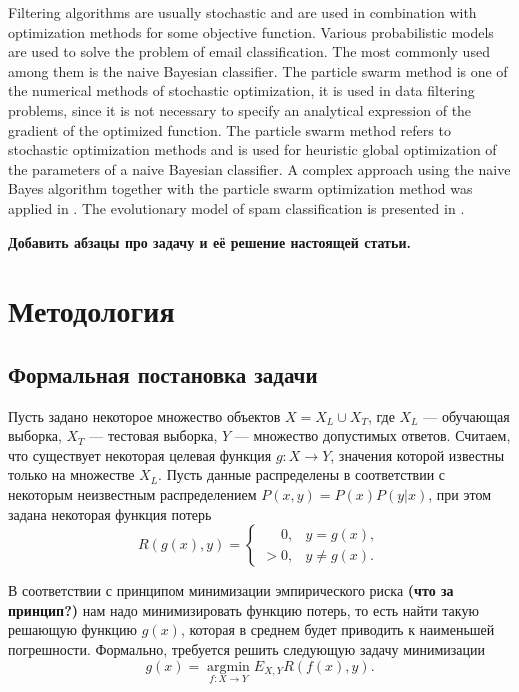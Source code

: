 \documentclass[12pt]{article}
\begin{document}
Filtering algorithms are usually stochastic \cite{Garg2021}
and are used in combination with optimization methods for some objective function.
Various probabilistic models are used to solve the problem of email classification. The most commonly used among them is the naive Bayesian classifier. The particle swarm method is one of the numerical methods of stochastic optimization, it is used in data filtering problems, since it is not necessary to specify an analytical expression of the gradient of the optimized function.
The particle swarm method refers to stochastic optimization methods and is used for heuristic global optimization of the parameters of a naive Bayesian classifier. A complex approach using the naive Bayes algorithm together with the particle swarm optimization method was applied in \cite{Parmar2020}.
The evolutionary model of spam classification is presented in \cite{Mohammad2020}.

{
\bf\color{amaranth}
Добавить абзацы про задачу и её решение настоящей статьи.
}



\section{Методология}
\subsection{Формальная постановка задачи}
Пусть задано некоторое множество объектов $ X = X_L \cup X_T $, где 
$X_L$ --- обучающая выборка, 
$X_T$ --- тестовая выборка, 
$Y$ --- множество допустимых ответов. Считаем, что существует некоторая целевая функция $g: X \rightarrow Y$, значения которой известны только на множестве $X_L$. Пусть данные распределены в соответствии с некоторым неизвестным распределением $P(x,y) = P(x) P(y|x)$, при этом задана некоторая функция потерь
$$
R(g(x), y) = 
\begin{cases} 
\phantom{>}0, & y = g(x), \\
> 0, & y \neq g(x).
\end{cases}
$$

В соответствии с принципом минимизации эмпирического риска 
{\bf\color{amaranth} (что за принцип?)} нам надо минимизировать функцию потерь, то есть найти такую решающую функцию $g(x)$, которая в среднем будет приводить к наименьшей погрешности. Формально, требуется решить следующую задачу минимизации
$$
g(x) = \operatorname*{argmin}_{f: X \rightarrow Y} E_{X,Y} R(f(x), y).
$$
\end{document}
